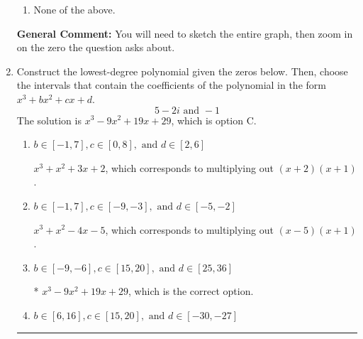 \documentclass{extbook}[14pt]
\newcommand{\litem}[1]{\item #1

\rule{\textwidth}{0.4pt}}
\begin{document}
\begin{enumerate}
{\begin{enumerate}[label=\Alph*.]
\item None of the above.\end{enumerate}
\textbf{General Comment:} You will need to sketch the entire graph, then zoom in on the zero the question asks about.
}
\litem{
Construct the lowest-degree polynomial given the zeros below. Then, choose the intervals that contain the coefficients of the polynomial in the form $x^3+bx^2+cx+d$.
\[ 5 - 2 i \text{ and } -1 \]
The solution is \( x^{3} -9 x^{2} +19 x + 29 \), which is option C.\begin{enumerate}[label=\Alph*.]
\item \( b \in [-1, 7], c \in [0, 8], \text{ and } d \in [2, 6] \)

$x^{3} + x^{2} +3 x + 2$, which corresponds to multiplying out $(x + 2)(x + 1)$.
\item \( b \in [-1, 7], c \in [-9, -3], \text{ and } d \in [-5, -2] \)

$x^{3} + x^{2} -4 x -5$, which corresponds to multiplying out $(x -5)(x + 1)$.
\item \( b \in [-9, -6], c \in [15, 20], \text{ and } d \in [25, 36] \)

* $x^{3} -9 x^{2} +19 x + 29$, which is the correct option.
\item \( b \in [6, 16], c \in [15, 20], \text{ and } d \in [-30, -27] \)


\end{enumerate}}
\end{enumerate}
\end{document}
